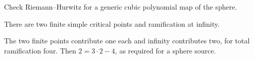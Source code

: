\begin{exercise}\label{exr:iv24-expand-16}
Check Riemann--Hurwitz for a generic cubic polynomial map of the sphere.
\end{exercise}
\begin{hint}
There are two finite simple critical points and ramification at infinity.
\end{hint}
\begin{solution}
The two finite points contribute one each and infinity contributes two, for total ramification four. Then \(2=3\cdot2-4\), as required for a sphere source.
\end{solution}


